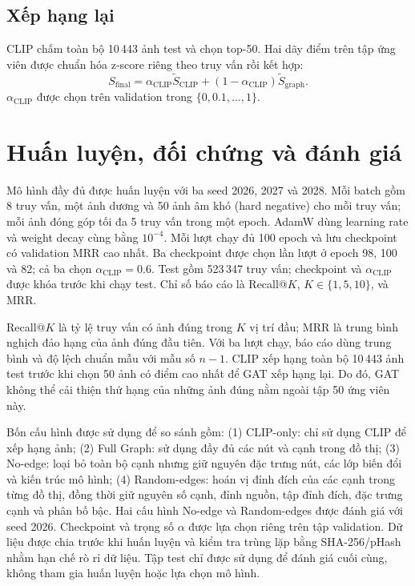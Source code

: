 \subsection{Xếp hạng lại}

CLIP chấm toàn bộ 10\,443 ảnh test và chọn top-50. Hai dãy điểm trên tập ứng viên được chuẩn hóa z-score riêng theo truy vấn rồi kết hợp:
\begin{equation}
S_{\mathrm{final}}=\alpha_{\mathrm{CLIP}}\widetilde S_{\mathrm{CLIP}}
+(1-\alpha_{\mathrm{CLIP}})\widetilde S_{\mathrm{graph}}.
\label{eq:fusion-formula-detail}
\end{equation}
$\alpha_{\mathrm{CLIP}}$ được chọn trên validation trong $\{0,0.1,\ldots,1\}$.

\section{Huấn luyện, đối chứng và đánh giá}
\label{sec:training-protocol}
\label{sec:metrics}

Mô hình đầy đủ được huấn luyện với ba seed 2026, 2027 và 2028. Mỗi batch gồm 8 truy vấn, một ảnh dương và 50 ảnh âm khó (hard negative) cho mỗi truy vấn; mỗi ảnh đóng góp tối đa 5 truy vấn trong một epoch. AdamW dùng learning rate và weight decay cùng bằng $10^{-4}$. Mỗi lượt chạy đủ 100 epoch và lưu checkpoint có validation MRR cao nhất. Ba checkpoint được chọn lần lượt ở epoch 98, 100 và 82; cả ba chọn $\alpha_{\mathrm{CLIP}}=0.6$. Test gồm 523\,347 truy vấn; checkpoint và $\alpha_{\mathrm{CLIP}}$ được khóa trước khi chạy test. Chỉ số báo cáo là Recall@$K$, $K\in\{1,5,10\}$, và MRR.

Recall@$K$ là tỷ lệ truy vấn có ảnh đúng trong $K$ vị trí đầu; MRR là trung bình nghịch đảo hạng của ảnh đúng đầu tiên. Với ba lượt chạy, báo cáo dùng trung bình và độ lệch chuẩn mẫu với mẫu số $n-1$. CLIP xếp hạng toàn bộ 10\,443 ảnh test trước khi chọn 50 ảnh có điểm cao nhất để GAT xếp hạng lại. Do đó, GAT không thể cải thiện thứ hạng của những ảnh đúng nằm ngoài tập 50 ứng viên này.

Bốn cấu hình được sử dụng để so sánh gồm: (1) CLIP-only: chỉ sử dụng CLIP để xếp hạng ảnh; (2) Full Graph: sử dụng đầy đủ các nút và cạnh trong đồ thị; (3) No-edge: loại bỏ toàn bộ cạnh nhưng giữ nguyên đặc trưng nút, các lớp biến đổi và kiến trúc mô hình; (4) Random-edges: hoán vị đỉnh đích của các cạnh trong từng đồ thị, đồng thời giữ nguyên số cạnh, đỉnh nguồn, tập đỉnh đích, đặc trưng cạnh và phân bố bậc. Hai cấu hình No-edge và Random-edges được đánh giá với seed 2026. Checkpoint và trọng số $\alpha$ được lựa chọn riêng trên tập validation. Dữ liệu được chia trước khi huấn luyện và kiểm tra trùng lặp bằng SHA-256/pHash nhằm hạn chế rò rỉ dữ liệu. Tập test chỉ được sử dụng để đánh giá cuối cùng, không tham gia huấn luyện hoặc lựa chọn mô hình.

